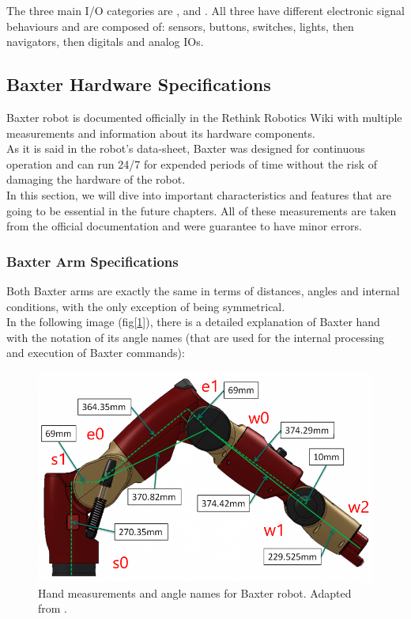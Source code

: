 \documentclass[11pt]{report} %
\begin{document}
The three main I/O categories are ,  and  \citep{cite_baxter_io_wiki}. All three have different electronic signal behaviours and are composed of: sensors, buttons, switches, lights, then navigators, then digitals and analog IOs.\\


\subsection{Baxter Hardware Specifications}

Baxter robot is documented officially in the Rethink Robotics Wiki with multiple measurements and information about its hardware components.\\

As it is said in the robot's data-sheet, Baxter was designed for continuous operation and can run 24/7 for expended periods of time without the risk of damaging the hardware of the robot\citep{cite_baxter_hardware_specifications}. \\

In this section, we will dive into important characteristics and features that are going to be essential in the future chapters. All of these measurements are taken from the official documentation and were guarantee to have minor errors.\\

\subsubsection{Baxter Arm Specifications}

Both Baxter arms are exactly the same in terms of distances, angles and internal conditions, with the only exception of being symmetrical.\\

In the following image (fig[\ref{fig_baxter_hand_measurements}]), there is a detailed explanation of Baxter hand with the notation of its angle names (that are used for the internal processing and execution of Baxter commands):

\begin{figure}[H]
    \centering
    \includegraphics[width=0.7\linewidth]{assets/imgs/baxter_robot/baxter_arm_specifications.png}
    \caption{Hand measurements and angle names for Baxter robot. Adapted from \citep{cite_baxter_hardware_specifications}.} 
    \label{fig_baxter_hand_measurements}
\end{figure}
\end{document}
